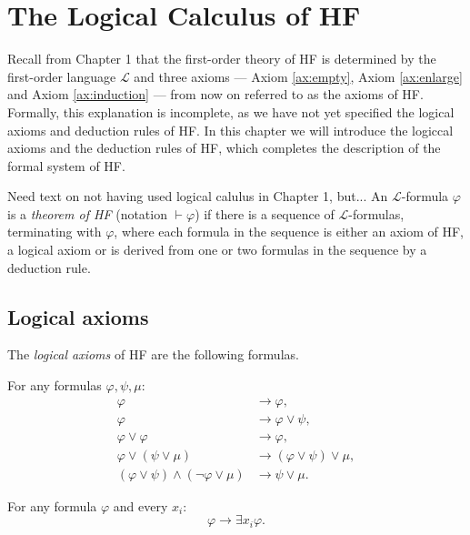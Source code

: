 \chapter{The Logical Calculus of HF}

Recall from Chapter 1 that 
the first-order theory of HF is determined by the first-order language $\mathcal{L}$ 
and three axioms — Axiom \ref{ax:empty}, Axiom \ref{ax:enlarge} and Axiom \ref{ax:induction} — 
from now on referred to as the axioms of HF.
Formally, this explanation is incomplete, 
as we have not yet specified the logical axioms and deduction rules of HF.
In this chapter we will introduce the logiccal axioms and the deduction rules
of HF, which completes the description of the formal system of HF.

Need text on not having used logical calulus in Chapter 1, but...
An $\mathcal{L}$-formula $\varphi$ is a \textit{theorem of HF} (notation $\vdash \varphi$) if there is a 
sequence of $\mathcal{L}$-formulas, terminating with $\varphi$, where each formula in the sequence
is either an axiom of HF, a logical axiom or is derived from one or two formulas in the 
sequence by a deduction rule.

\section{Logical axioms}

The \textit{logical axioms} of HF are the following formulas.

\begin{definition}
    \label{ax:Bool.Axiom}
    \leanok
    For any formulas $\varphi, \psi, \mu$:
    $$
    \begin{aligned}
    \varphi & \rightarrow \varphi, \\
    \varphi & \rightarrow \varphi \lor \psi, \\
    \varphi \lor \varphi & \rightarrow \varphi, \\
    \varphi \lor(\psi \lor \mu) & \rightarrow(\varphi \lor \psi) \lor \mu, \\
    (\varphi \lor \psi) \land(\neg \varphi \lor \mu) & \rightarrow \psi \lor \mu .
    \end{aligned}
    $$
\end{definition}

\begin{definition}
    \label{ax:Spec.Axiom}
    \leanok
    For any formula $\varphi$ and every $x_i$:
    $$\varphi \rightarrow \exists x_i \varphi.$$
\end{definition}

